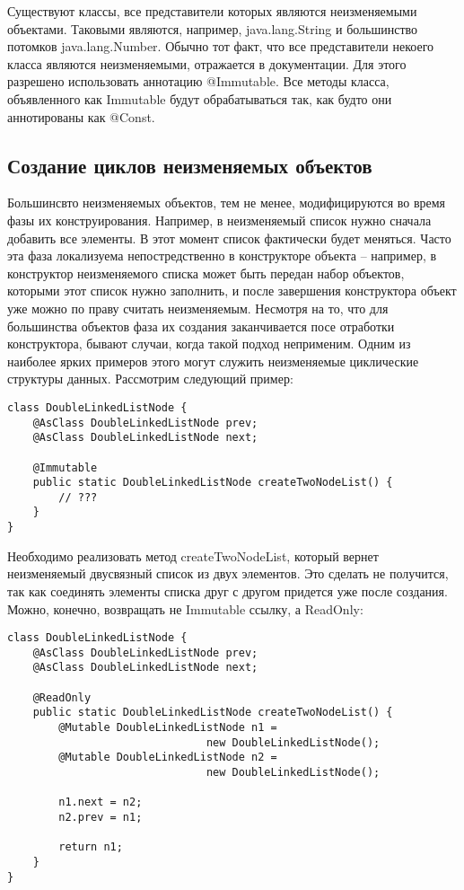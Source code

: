 Существуют классы, все представители которых являются неизменяемыми объектами. Таковыми являются, например, java.lang.String и большинство потомков java.lang.Number. Обычно тот факт, что все представители некоего класса являются неизменяемыми, отражается в документации. Для этого разрешено использовать аннотацию @Immutable. Все методы класса, объявленного как Immutable будут обрабатываться так, как будто они аннотированы как @Const.

\subsection{Создание циклов неизменяемых объектов}

Большинсвто неизменяемых объектов, тем не менее, модифицируются во время фазы их конструирования. Например, в неизменяемый список нужно сначала добавить все элементы. В этот момент список фактически будет меняться. Часто эта фаза локализуема непостредственно в конструкторе объекта -- например, в конструктор неизменяемого списка может быть передан набор объектов, которыми этот список нужно заполнить, и после завершения конструктора объект уже можно по праву считать неизменяемым. Несмотря на то, что для большинства объектов фаза их создания заканчивается посе отработки конструктора, бывают случаи, когда такой подход неприменим. Одним из наиболее ярких примеров этого могут служить неизменяемые циклические структуры данных. Рассмотрим следующий пример:

\begin{lstlisting}[caption=DoubleLinkedListNode.java, label=code:circular_list_node]
class DoubleLinkedListNode {
    @AsClass DoubleLinkedListNode prev;
    @AsClass DoubleLinkedListNode next;
    
    @Immutable
    public static DoubleLinkedListNode createTwoNodeList() {
    	// ???
    }
}
\end{lstlisting} 

Необходимо реализовать метод createTwoNodeList, который вернет неизменяемый двусвязный список из двух элементов. Это сделать не получится, так как соединять элементы списка друг с другом придется уже после создания. Можно, конечно, возвращать не Immutable ссылку, а ReadOnly:
 
\begin{lstlisting}[caption=DoubleLinkedListNode.java, label=code:circular_list_node_ro]
class DoubleLinkedListNode {
    @AsClass DoubleLinkedListNode prev;
    @AsClass DoubleLinkedListNode next;
    
    @ReadOnly
    public static DoubleLinkedListNode createTwoNodeList() {
    	@Mutable DoubleLinkedListNode n1 = 
                               new DoubleLinkedListNode();
        @Mutable DoubleLinkedListNode n2 = 
                               new DoubleLinkedListNode();
    	
        n1.next = n2;
        n2.prev = n1;
    
        return n1;  
    }
}
\end{lstlisting} 

